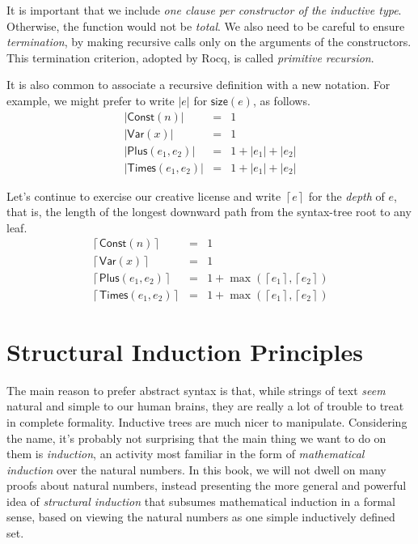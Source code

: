 \documentclass{amsbook}
\theoremstyle{definition}
\theoremstyle{remark}
\numberwithin{section}{chapter}
\numberwithin{equation}{chapter}
\begin{document}
It is important that we include \emph{one clause per constructor of the inductive type}.
Otherwise, the function would not be \emph{total}.
We also need to be careful to ensure \emph{termination}, by making recursive calls only on the arguments of the constructors.
This termination criterion, adopted by Rocq, is called \emph{primitive recursion}.

\newcommand{\size}[1]{{\left \lvert #1 \right \rvert}}

It is also common to associate a recursive definition with a new notation.
For example, we might prefer to write $\size{e}$ for $\mathsf{size}(e)$, as follows.
\begin{eqnarray*}
  \size{\mathsf{Const}(n)} &=& 1 \\
  \size{\mathsf{Var}(x)} &=& 1 \\
  \size{\mathsf{Plus}(e_1, e_2)} &=& 1 + \size{e_1} + \size{e_2} \\
  \size{\mathsf{Times}(e_1, e_2)} &=& 1 + \size{e_1} + \size{e_2}
\end{eqnarray*}

\newcommand{\depth}[1]{{\left \lceil #1 \right \rceil}}

Let's continue to exercise our creative license and write $\depth{e}$ for the \emph{depth} of $e$, that is, the length of the longest downward path from the syntax-tree root to any leaf.
\begin{eqnarray*}
  \depth{\mathsf{Const}(n)} &=& 1 \\
  \depth{\mathsf{Var}(x)} &=& 1 \\
  \depth{\mathsf{Plus}(e_1, e_2)} &=& 1 + \max(\depth{e_1}, \depth{e_2}) \\
  \depth{\mathsf{Times}(e_1, e_2)} &=& 1 + \max(\depth{e_1}, \depth{e_2})
\end{eqnarray*}


\section{Structural Induction Principles}

The main reason to prefer abstract syntax is that, while strings of text \emph{seem} natural and simple to our human brains, they are really a lot of trouble to treat in complete formality.
Inductive trees are much nicer to manipulate.
Considering the name, it's probably not surprising that the main thing we want to do on them is \emph{induction}, an activity most familiar in the form of \emph{mathematical induction} over the natural numbers.
In this book, we will not dwell on many proofs about natural numbers, instead presenting the more general and powerful idea of \emph{structural induction} that subsumes mathematical induction in a formal sense, based on viewing the natural numbers as one simple inductively defined set.
\end{document}
